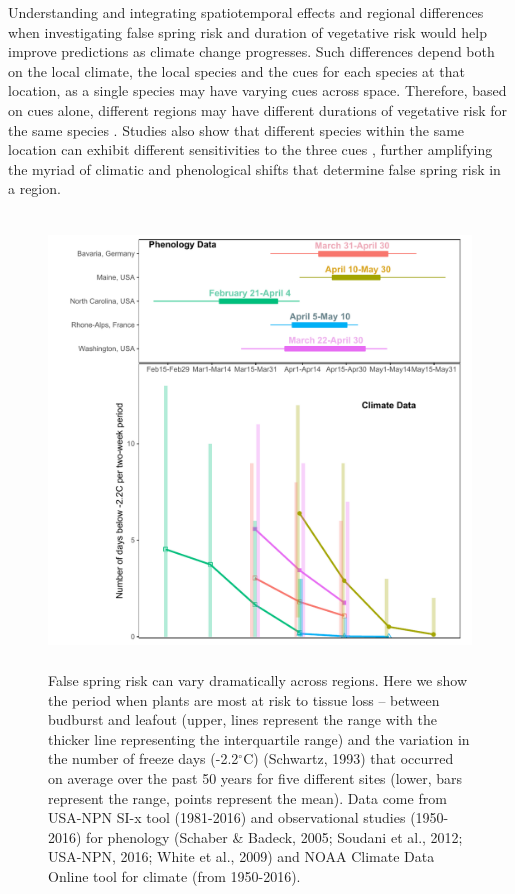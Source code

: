 \documentclass{article}\usepackage[]{graphicx}\usepackage[]{color}
\begin{document}
Understanding and integrating spatiotemporal effects and regional differences when investigating false spring risk and duration of vegetative risk would help improve predictions as climate change progresses. Such differences depend both on the local climate, the local species and the cues for each species at that location, as a single species may have varying cues across space. Therefore, based on cues alone, different regions may have different durations of vegetative risk for the same species \citep {Caffarra2011, Partanen2004, Viheraaarnio2006}. Studies also show that different species within the same location can exhibit different sensitivities to the three cues \citep{Basler2012, Laube2013}, further amplifying the myriad of climatic and phenological shifts that determine false spring risk in a region. 
\begin{figure} [H] 
 \begin{center}
 \includegraphics[width=12cm, height=12cm]{..//figure/RegRisk_flipped.pdf} 
 \caption{False spring risk can vary dramatically across regions. Here we show the period when plants are most at risk to tissue loss -- between budburst and leafout (upper, lines represent the range with the thicker line representing the interquartile range) and the variation in the number of freeze days (-2.2$^{\circ}$C) (Schwartz, 1993) that occurred on average over the past 50 years for five different sites (lower, bars represent the range, points represent the mean). Data come from USA-NPN SI-x tool (1981-2016) and observational studies (1950-2016) for phenology (Schaber \& Badeck, 2005; Soudani et al., 2012; USA-NPN, 2016; White et al., 2009) and NOAA Climate Data Online tool for climate (from 1950-2016). } \label{fig:region}  
 \end{center}
 \end{figure}
\end{document}
